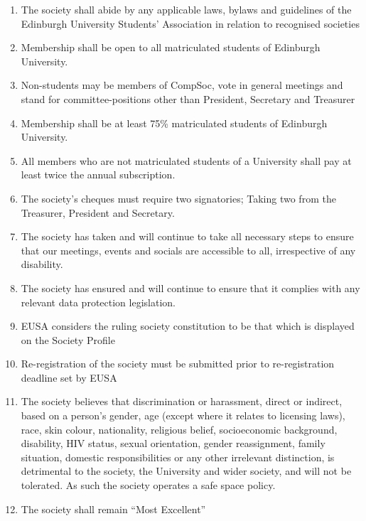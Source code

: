 \documentclass{article}
\begin{document}
\begin{enumerate}
  \item The society shall abide by any applicable laws, bylaws and guidelines of the Edinburgh University Students’ Association in relation to recognised societies

  \item Membership shall be open to all matriculated students of Edinburgh University.

  \item Non-students may be members of CompSoc, vote in general meetings and stand for committee-positions other than President, Secretary and Treasurer

  \item Membership shall be at least 75\% matriculated students of Edinburgh University.

  \item All members who are not matriculated students of a University shall pay at least twice the annual subscription.

  \item The society’s cheques must require two signatories; Taking two from the Treasurer, President and Secretary.

  \item The society has taken and will continue to take all necessary steps to ensure that our meetings, events and socials are accessible to all, irrespective of any disability. 

  \item The society has ensured and will continue to ensure that it complies with any relevant data protection legislation.

  \item EUSA considers the ruling society constitution to be that which is displayed on the Society Profile

  \item Re-registration of the society must be submitted prior to re-registration deadline set by EUSA

  \item The society believes that discrimination or harassment, direct or indirect,
    based on a person’s gender, age (except where it relates to licensing
    laws), race, skin colour, nationality, religious belief, socioeconomic background,
    disability, HIV status, sexual orientation, gender reassignment,
    family situation, domestic responsibilities or any other irrelevant distinction,
    is detrimental to the society, the University and wider society, and
    will not be tolerated. As such the society operates a safe space policy.
    
  \item The society shall remain ``Most Excellent''

\end{enumerate}
\end{document}

